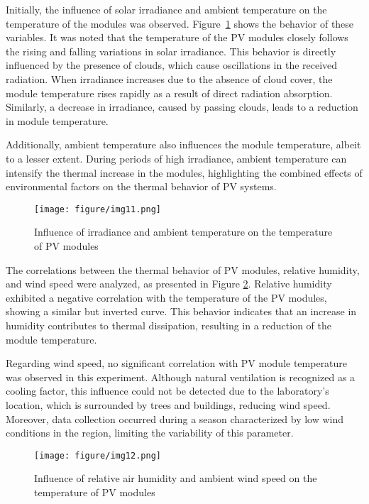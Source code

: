 \documentclass{ieeeaccess}
\begin{document}

Initially, the influence of solar irradiance and ambient temperature on the temperature of the modules was observed. Figure~\ref{fig:temp_irradiancia} shows the behavior of these variables. It was noted that the temperature of the PV modules closely follows the rising and falling variations in solar irradiance. This behavior is directly influenced by the presence of clouds, which cause oscillations in the received radiation. When irradiance increases due to the absence of cloud cover, the module temperature rises rapidly as a result of direct radiation absorption. Similarly, a decrease in irradiance, caused by passing clouds, leads to a reduction in module temperature.

Additionally, ambient temperature also influences the module temperature, albeit to a lesser extent. During periods of high irradiance, ambient temperature can intensify the thermal increase in the modules, highlighting the combined effects of environmental factors on the thermal behavior of PV systems.



\begin{figure}[h]
    \centering
    \texttt{[image: figure/img11.png]}
    \caption{Influence of irradiance and ambient temperature on the temperature of PV modules}
    \label{fig:temp_irradiancia}
\end{figure}


The correlations between the thermal behavior of PV modules, relative humidity, and wind speed were analyzed, as presented in Figure \ref{fig:umidade_vento}. Relative humidity exhibited a negative correlation with the temperature of the PV modules, showing a similar but inverted curve. This behavior indicates that an increase in humidity contributes to thermal dissipation, resulting in a reduction of the module temperature.

Regarding wind speed, no significant correlation with PV module temperature was observed in this experiment. Although natural ventilation is recognized as a cooling factor, this influence could not be detected due to the laboratory's location, which is surrounded by trees and buildings, reducing wind speed. Moreover, data collection occurred during a season characterized by low wind conditions in the region, limiting the variability of this parameter.


\begin{figure}[h]
    \centering
    \texttt{[image: figure/img12.png]}
    \caption{Influence of relative air humidity and ambient wind speed on the temperature of PV modules}
    \label{fig:umidade_vento}
\end{figure}
\end{document}
